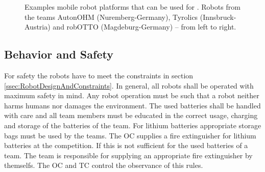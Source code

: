 \begin{figure} [h!]
	\begin{center}
		 \hfill
		 \hfill
	\end{center}
	\caption{Examples mobile robot platforms that can be used for \RCAW. Robots from the teams AutonOHM (Nuremberg-Germany), Tyrolics (Innsbruck-Austria) and robOTTO (Magdeburg-Germany) -- from left to right. }
	\label{fig:example_robots}
\end{figure}


\subsection{Behavior and Safety} \label{ssec:RobotBehaviorAndSafety}
For safety the robots have to meet the constraints in section \ref{ssec:RobotDesignAndConstraints}. In general, all robots shall be operated with maximum safety in mind. Any robot operation must be such that a robot neither harms humans nor damages the environment. 
The used batteries shall be handled with care and all team members must be educated in the correct usage, charging and storage of the batteries of the team. For lithium batteries appropriate storage bags must be used by the teams. The OC supplies a fire extinguisher for lithium batteries at the competition. If this is not sufficient for the used batteries of a team. The team is responsible for supplying an appropriate fire extinguisher by themselfs. The OC and TC control the observance of this rules.

